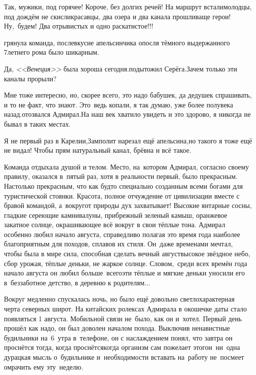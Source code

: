 \diagdash Так, мужики, под горячее! Короче, без долгих речей! На маршрут встали\mdash молодцы, под дождём не скисли\mdash красавцы, два озера и два канала прошли\mdash ваще герои! Ну,~будем! Два отрывистых и одно раскатистое!!!

\mdash грянула команда, послевкусие апельсинчика опосля тёмного выдержанного 7\sdash летнего рома было шикарным.

\diagdash Да, \textit{<<Венеция>>} была хороша сегодня.\mdash подытожил Серёга.\mdash Зачем только эти каналы прорыли?

\diagdash Мне тоже интересно, но, скорее всего, это надо бабушек, да дедушек спрашивать, и то не факт, что знают. Это~ведь копали, я так думаю, уже более полувека назад.\mdash отозвался Адмирал.\mdash На наш век хватило увидеть и это здорово, я никогда не бывал в таких местах.

\diagdash Я не первый раз в Карелии,\mdash Замполит нарезал ещё апельсина,\mdash но такого я тоже ещё не видал! Чтобы прям натуральный канал, брёвна и всё такое.

Команда отдыхала душой и телом. Место, на~котором Адмирал, согласно своему правилу, оказался в~пятый раз, хотя в реальности первый, было прекрасным. Настолько прекрасным, что как будто специально созданным всеми богами для туристической стоянки. Красота, полное отчуждение от цивилизации вместе с бравой командой, а~вокруг\mdash от природы дух захватывает! Высокие янтарные сосны, гладкие сереющие камни\sdash валуны, прибрежный зеленый камыш, оранжевое закатное солнце, окрашивающее всё вокруг в свои тёплые тона. Адмирал особенно любил начало августа, справедливо полагая это время года наиболее благоприятным для походов, сплавов их стиля. Он~даже временами мечтал, чтобы была в мире сила, способная сделать вечный август\mdash высокое звёздное небо, сбор урожая, тёплые деньки, не жаркое солнце. Словом,~среди всех времён года начало августа он любил больше~всего\mdash эти тёплые и мягкие деньки уносили его в~беззаботное детство, в деревню к родителям$\ldots$

Вокруг медленно спускалась ночь, но было ещё довольно светло\mdash характерная черта северных широт. На китайских ролексах Адмирала в окошечке даты стало появляться 1 августа. Мобильной связи не~было, как он и~хотел. Первый день прошёл как надо, он был доволен началом похода. Выключив ненавистные будильники на~6~утра в~телефоне, он с наслаждением понял, что завтра он проснётся тогда, когда проснётся\mdash когда организм сам пожелает этого\mdash и~ни~одна дурацкая мысль о~будильнике и~необходимости вставать на~работу не~посмеет омрачить ему эту~неделю. 

\begin{center}
\end{center}